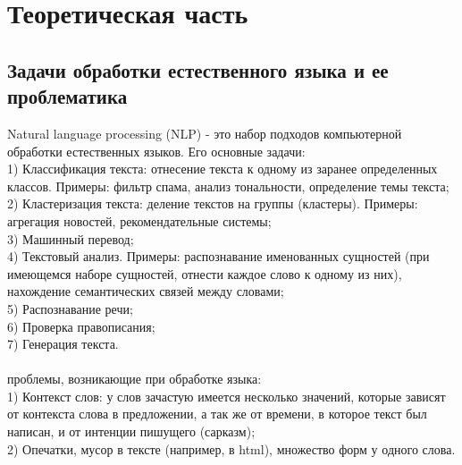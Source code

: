 \documentclass{article}
\newcommand\tab[1][1cm]{\hspace*{#1}}
\begin{document}
\section{Теоретическая часть} 
\subsection{Задачи обработки естественного языка и ее проблематика}
\tab Natural language processing (NLP) - это набор подходов компьютерной обработки естественных языков. Его основные задачи:\\
\tab\tab1) Классификация текста: отнесение текста к одному из заранее определенных классов. Примеры: фильтр спама, анализ тональности, определение темы текста;\\
\tab\tab2) Кластеризация текста: деление текстов на группы (кластеры). Примеры: агрегация новостей, рекомендательные системы;\\ 
\tab\tab3) Машинный перевод;\\ 
\tab\tab4) Текстовый анализ. Примеры: распознавание именованных сущностей (при имеющемся наборе сущностей, отнести каждое слово к одному из них), нахождение семантических связей между словами;\\ 
\tab\tab5) Распознавание речи;\\
\tab\tab6) Проверка правописания;\\
\tab\tab7) Генерация текста.\\
\\
 проблемы, возникающие при обработке языка:\\
\tab\tab1) Контекст слов: у слов зачастую имеется несколько значений, которые зависят от контекста слова в предложении, а так же от времени, в которое текст был написан, и от интенции пишущего (сарказм);\\
\tab\tab2) Опечатки, мусор в тексте (например, в html), множество форм у одного слова.\\
\end{document}
